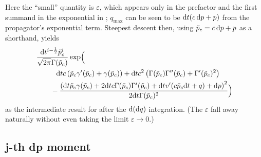 Here the ``small'' quantity is \(\varepsilon\), which appears only in the prefactor and the first summand in the exponential in ; \(q_{\text{max}}\) can be seen to be \(\mathrm{d} t (c\,\mathrm{d} p+p)\) from the propagator's exponential term. Steepest descent then, using \(\tilde p_c = c\,\mathrm{d} p + p\) as a shorthand, yields
\begin{align}
	\label{eqn:dq-integration-finished}
	& \frac{\mathrm{d} t^{i-\frac12} \tilde p_c^i}{\sqrt{2 \pi } \Gamma (\tilde p_c)} \operatorname{exp} \Bigl(
		\\ &\qquad \notag
		\phantom{+}\mathrm{d} t c  \left(\tilde p_c \gamma '(\tilde p_c)
		+\gamma (\tilde p_c)\right)
		+\mathrm{d} t c ^2 \left(\Gamma (\tilde p_c) \Gamma ''(\tilde p_c)
		+\Gamma '(\tilde p_c)^2\right)
		\\ &\qquad \notag
		-\frac{\left(\mathrm{d} t \tilde p_c \gamma (\tilde p_c)
		+2 \mathrm{d} t c  \Gamma (\tilde p_c) \Gamma '(\tilde p_c)
		+\mathrm{d} t v'(c  \tilde p_c \mathrm{d} t +q)+\mathrm{d} p\right)^2}{2 \mathrm{d} t \Gamma (\tilde p_c)^2}
	 \Bigr)
\end{align}
as the intermediate result for  after the \(\mathrm{d}(\mathrm{d} q)\) integration. (The \(\varepsilon\) fall away naturally without even taking the limit \(\varepsilon\to0\).)



\subsection{j-th dp moment}

